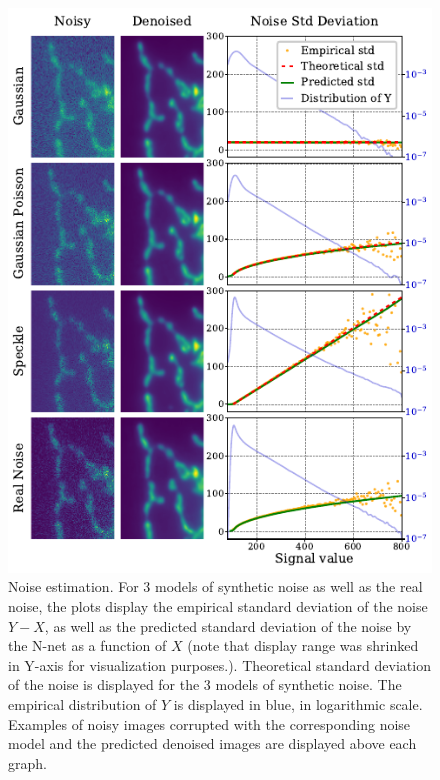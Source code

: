 \documentclass[lettersize,journal]{IEEEtran}
\begin{document}
\begin{figure}[!htbp]
\vskip -0.1in
\begin{center}
\centerline{\includegraphics[width=\columnwidth]{fig_noise_std.pdf}}
\caption[Noise estimation]{Noise estimation.
For 3 models of synthetic noise as well as the real noise, the plots display the empirical standard deviation of the noise $Y - X$, as well as the predicted standard deviation of the noise by the N-net as a function of $X$ (note that display range was shrinked in Y-axis for visualization purposes.).
Theoretical standard deviation of the noise is displayed for the 3 models of synthetic noise.
The empirical distribution of $Y$ is displayed in blue, in logarithmic scale.
Examples of noisy images corrupted with the corresponding noise model and the predicted denoised images are displayed above each graph.}
\label{fig:noisestd}
\end{center}
\end{figure}
\end{document}
